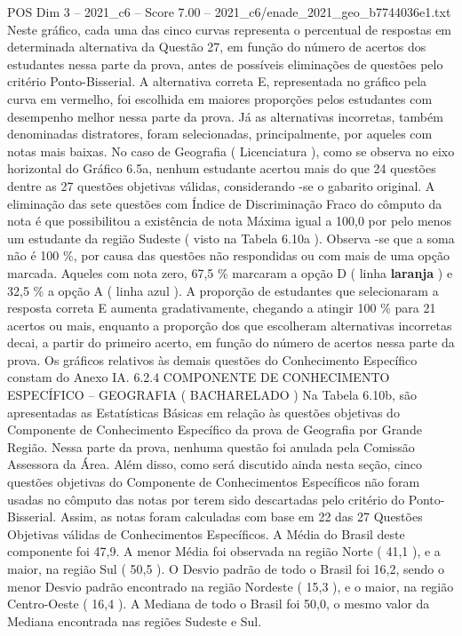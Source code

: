 \begin{textsample}{POS Dim 3 – 2021\_c6 – Score 7.00 – 2021\_c6/enade\_2021\_geo\_b7744036e1.txt}
Neste gráfico, cada uma das cinco curvas representa o percentual de respostas em determinada alternativa da Questão 27, em função do número de acertos dos estudantes nessa parte da prova, antes de possíveis eliminações de questões pelo critério Ponto-Bisserial.
A alternativa correta E, representada no gráfico pela curva em vermelho, foi escolhida em maiores proporções pelos estudantes com desempenho melhor nessa parte da prova.
Já as alternativas incorretas, também denominadas distratores, foram selecionadas, principalmente, por aqueles com notas mais baixas.
No caso de Geografia ( Licenciatura ), como se observa no eixo horizontal do Gráfico 6.5a, nenhum estudante acertou mais do que 24 questões dentre as 27 questões objetivas válidas, considerando -se o gabarito original.
A eliminação das sete questões com Índice de Discriminação Fraco do cômputo da nota é que possibilitou a existência de nota Máxima igual a 100,0 por pelo menos um estudante da região Sudeste ( visto na Tabela 6.10a ).
Observa -se que a soma não é 100 \%, por causa das questões não respondidas ou com mais de uma opção marcada.
Aqueles com nota zero, 67,5 \% marcaram a opção D ( linha \textbf{laranja} ) e 32,5 \% a opção A ( linha azul ).
A proporção de estudantes que selecionaram a resposta correta E aumenta gradativamente, chegando a atingir 100 \% para 21 acertos ou mais, enquanto a proporção dos que escolheram alternativas incorretas decai, a partir do primeiro acerto, em função do número de acertos nessa parte da prova.
Os gráficos relativos às demais questões do Conhecimento Específico constam do Anexo IA. 6.2.4 COMPONENTE DE CONHECIMENTO ESPECÍFICO – GEOGRAFIA ( BACHARELADO ) Na Tabela 6.10b, são apresentadas as Estatísticas Básicas em relação às questões objetivas do Componente de Conhecimento Específico da prova de Geografia por Grande Região.
Nessa parte da prova, nenhuma questão foi anulada pela Comissão Assessora da Área.
Além disso, como será discutido ainda nesta seção, cinco questões objetivas do Componente de Conhecimentos Específicos não foram usadas no cômputo das notas por terem sido descartadas pelo critério do Ponto-Bisserial.
Assim, as notas foram calculadas com base em 22 das 27 Questões Objetivas válidas de Conhecimentos Específicos.
A Média do Brasil deste componente foi 47,9.
A menor Média foi observada na região Norte ( 41,1 ), e a maior, na região Sul ( 50,5 ).
O Desvio padrão de todo o Brasil foi 16,2, sendo o menor Desvio padrão encontrado na região Nordeste ( 15,3 ), e o maior, na região Centro-Oeste ( 16,4 ).
A Mediana de todo o Brasil foi 50,0, o mesmo valor da Mediana encontrada nas regiões Sudeste e Sul.

\end{textsample}
